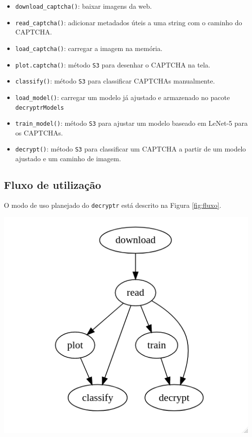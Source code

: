 \documentclass[12pt,]{report}
\providecommand{\tightlist}{%
  \setlength{\itemsep}{0pt}\setlength{\parskip}{0pt}}
\let\origfigure\figure
\let\endorigfigure\endfigure
\renewenvironment{figure}[1][2] {
    \expandafter\origfigure\expandafter[H]
} {
    \endorigfigure
}
\begin{document}
\begin{itemize}
\tightlist
\item
  \texttt{download\_captcha()}: baixar imagens da web.
\item
  \texttt{read\_captcha()}: adicionar metadados úteis a uma string com o caminho do CAPTCHA.
\item
  \texttt{load\_captcha()}: carregar a imagem na memória.
\item
  \texttt{plot.captcha()}: método \texttt{S3} para desenhar o CAPTCHA na tela.
\item
  \texttt{classify()}: método \texttt{S3} para classificar CAPTCHAs manualmente.
\item
  \texttt{load\_model()}: carregar um modelo já ajustado e armazenado no pacote \texttt{decryptrModels}
\item
  \texttt{train\_model()}: método \texttt{S3} para ajustar um modelo baseado em LeNet-5 para os CAPTCHAs.
\item
  \texttt{decrypt()}: método \texttt{S3} para classificar um CAPTCHA a partir de um modelo ajustado e um caminho de imagem.
\end{itemize}

\hypertarget{fluxo-de-utilizauxe7uxe3o}{%
\subsection{Fluxo de utilização}\label{fluxo-de-utilizauxe7uxe3o}}

O modo de uso planejado do \texttt{decryptr} está descrito na Figura \ref{fig:fluxo}.

\begin{figure}

{\centering \includegraphics[width=0.6\linewidth]{assets/img/fluxo} 

}

\caption{Fluxo de utilização do pacote `decryptr`.}\label{fig:fluxo}
\end{figure}
\end{document}
